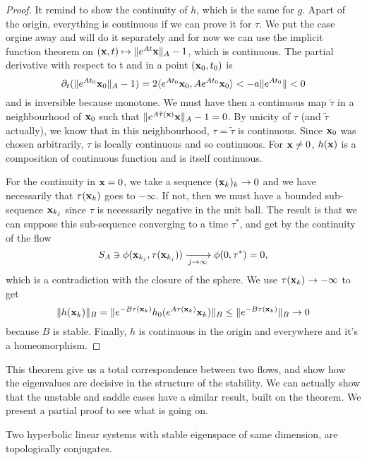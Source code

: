 \begin{proof}
It remind to show the continuity of $h$, which is the same for $g$. Apart of the origin, everything is continuous if we can prove it for $\tau$. We put the case orgine away and will do it separately and for now we can use the implicit function theorem on $(\mathbf{x},t)\mapsto\|e^{At}\mathbf{x}\|_A-1$, which is continuous. The partial derivative with respect to t and in a point $(\mathbf{x}_0,t_0)$ is 
$$\partial_t(\|e^{At_0}\mathbf{x}_0\|_A-1)
=2\langle e^{At_0}\mathbf{x}_0,Ae^{At_0}\mathbf{x}_0\rangle
<-a\|e^{At_0}\| < 0$$
and is inversible because monotone. We must have then a continuous map $\tilde{\tau}$ in a neighbourhood of $\mathbf{x}_0$ such that $\|e^{A\tilde{\tau}(\mathbf{x})}\mathbf{x}\|_A-1=0$. By unicity of $\tau$ (and $\tilde{\tau}$ actually), we know that in this neighbourhood, $\tau=\tilde{\tau}$ is continuous. Since $\mathbf{x}_0$ was chosen arbitrarily, $\tau$ is locally continuous and so continuous. For $\mathbf{x}\neq0$, $h(\mathbf{x})$ is a composition of continuous function and is itself continuous.

For the continuity in $\mathbf{x}=0$, we take a sequence $(\mathbf{x}_k)_k\to0$  and we have necessarily that $\tau(\mathbf{x}_k)$ goes to $-\infty$. If not, then we must have a bounded sub-sequence $\mathbf{x}_{k_j}$ since $\tau$ is necessarily negative in the unit ball. The result is that we can suppose this sub-sequence converging to a time $\tau^*$, and get by the continuity of the flow
$$S_A \ni \phi(\mathbf{x}_{k_j},\tau(\mathbf{x}_{k_j}))
\xrightarrow[j\to\infty]{} \phi(0,\tau^*)=0,$$ which is a contradiction with the closure of the sphere. We use $\tau(\mathbf{x}_k)\to-\infty$ to get 
$$\|h(\mathbf{x}_k)\|_B 
= \|e^{-B\tau(\mathbf{x}_k)}h_0(e^{A\tau(\mathbf{x}_k)}\mathbf{x}_k)\|_B 
\leq \|e^{-B\tau(\mathbf{x}_k)}\|_B\to 0$$
because $B$ is stable. Finally, $h$ is continuous in the origin and everywhere and it's a homeomorphism.
\end{proof}
This theorem give us a total correspondence between two flows, and show how the eigenvalues are decisive in the structure of the stability. We can actually show that the unstable and saddle cases have a similar result, built on the theorem. We present a partial proof to see what is going on. 
\begin{corollaire}
    Two hyperbolic linear systems with stable eigenspace of same dimension, are topologically conjugates.
\end{corollaire}
